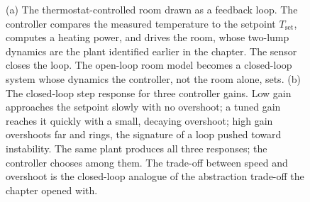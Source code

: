 \begin{figure}[htbp]
\caption[A thermostat as a closed loop]{(a) The thermostat-controlled room
drawn as a feedback loop. The controller compares the measured temperature
to the setpoint $T_{\text{set}}$, computes a heating power, and drives the
room, whose two-lump dynamics are the plant identified earlier in the
chapter. The sensor closes the loop. The open-loop room model becomes a
closed-loop system whose dynamics the controller, not the room alone, sets.
(b) The closed-loop step response for three controller gains. Low gain
approaches the setpoint slowly with no overshoot; a tuned gain reaches it
quickly with a small, decaying overshoot; high gain overshoots far and
rings, the signature of a loop pushed toward instability. The same plant
produces all three responses; the controller chooses among them. The
trade-off between speed and overshoot is the closed-loop analogue of the
abstraction trade-off the chapter opened with.}
\label{fig:vol02:ch18:feedback-loop}
\end{figure}
